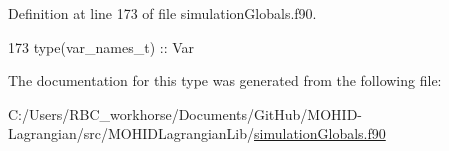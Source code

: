 Definition at line 173 of file simulation\+Globals.\+f90.


\begin{DoxyCode}
173         \textcolor{keywordtype}{type}(var\_names\_t)   :: Var
\end{DoxyCode}


The documentation for this type was generated from the following file\+:\begin{DoxyCompactItemize}
\item 
C\+:/\+Users/\+R\+B\+C\+\_\+workhorse/\+Documents/\+Git\+Hub/\+M\+O\+H\+I\+D-\/\+Lagrangian/src/\+M\+O\+H\+I\+D\+Lagrangian\+Lib/\mbox{\hyperlink{simulation_globals_8f90}{simulation\+Globals.\+f90}}\end{DoxyCompactItemize}
